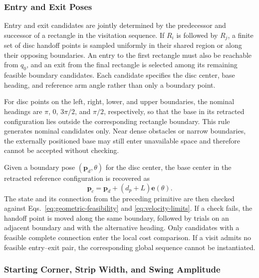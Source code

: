 \documentclass[a4paper,11pt]{article}
\providecommand{\DIFaddend}{} %
\begin{document}
\DIFaddend \subsubsection{Entry and Exit Poses}

Entry and exit candidates are jointly determined by the predecessor and successor of a rectangle in the visitation sequence. If $R_i$ is followed by $R_j$, a finite set of disc handoff points is sampled uniformly in their shared region or along their opposing boundaries. An entry to the first rectangle must also be reachable from $q_0$, and an exit from the final rectangle is selected among its remaining feasible boundary candidates. Each candidate specifies the disc center, base heading, and reference arm angle rather than only a boundary point.

For disc points on the left, right, lower, and upper boundaries, the nominal headings are $\pi$, $0$, $3\pi/2$, and $\pi/2$, respectively, so that the base in its retracted configuration lies outside the corresponding rectangle boundary. This rule generates nominal candidates only. Near dense obstacles or narrow boundaries, the externally positioned base may still enter unavailable space and therefore cannot be accepted without checking.

Given a boundary pose $(\mathbf p_d,\theta)$ for the disc center, the base center in the retracted reference configuration is recovered as
\begin{equation}
\mathbf p_c=\mathbf p_d+(d_p+L)\mathbf e(\theta).
\tag{10}
\label{eq:entry-base-center}
\end{equation}
The state and its connection from the preceding primitive are then checked against Eqs.~\eqref{eq:geometric-feasibility} and \eqref{eq:velocity-limits}. If a check fails, the handoff point is moved along the same boundary, followed by trials on an adjacent boundary and with the alternative heading. Only candidates with a feasible complete connection enter the local cost comparison. If a visit admits no feasible entry--exit pair, the corresponding global sequence cannot be instantiated.

\subsubsection{Starting Corner, Strip Width, and Swing Amplitude}
\end{document}
